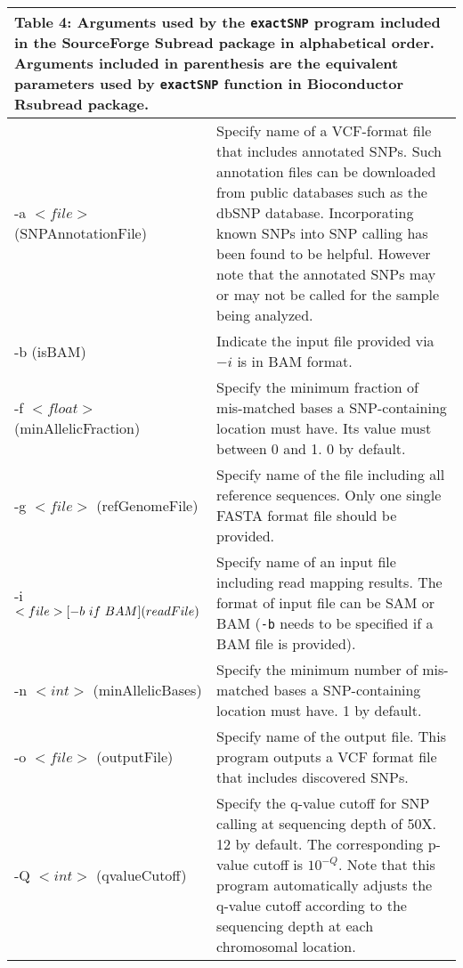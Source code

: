 \documentclass[12pt]{report}
\newcommand{\code}[1]{{\small\texttt{#1}}}
\newcommand{\Subread}{\textsf{Subread}}
\newcommand{\Rsubread}{\textsf{Rsubread}}
\begin{document}
\begin{longtable}{|p{4.5cm}|p{11cm}|}
\multicolumn{2}{p{16cm}}{Table 4: Arguments used by the \code{exactSNP} program included in the SourceForge {\Subread} package in alphabetical order.
Arguments included in parenthesis are the equivalent parameters used by \code{exactSNP} function in Bioconductor {\Rsubread} package.}
\endfirsthead
\hline
Arguments & Description \\
\hline
-a $<file>$ \newline (SNPAnnotationFile) & Specify name of a VCF-format file that includes annotated SNPs. Such annotation files can be downloaded from public databases such as the dbSNP database. Incorporating known SNPs into SNP calling has been found to be helpful. However note that the annotated SNPs may or may not be called for the sample being analyzed. \\
\hline
-b \newline (isBAM) & Indicate the input file provided via $-i$ is in BAM format. \\
\hline
-f $<float>$ \newline (minAllelicFraction) & Specify the minimum fraction of mis-matched bases a SNP-containing location must have. Its value must between 0 and 1. 0 by default. \\
\hline
-g $<file>$ \newline (refGenomeFile) & Specify name of the file including all reference sequences. Only one single FASTA format file should be provided. \\
\hline
-i $<file> [-b\ if\ BAM] \newline (readFile)$ & Specify name of an input file including read mapping results. The format of input file can be SAM or BAM  (\code{-b} needs to be specified if a BAM file is provided).\\
\hline
-n $<int>$ \newline (minAllelicBases) & Specify the minimum number of mis-matched bases a SNP-containing location must have. 1 by default.\\
\hline
-o $<file>$ \newline (outputFile) & Specify name of the output file. This program outputs a VCF format file that includes discovered SNPs. \\
\hline
-Q $<int>$  \newline (qvalueCutoff) &  Specify the q-value cutoff for SNP calling at sequencing depth of 50X. 12 by default. The corresponding p-value cutoff is $10^{-Q}$. Note that this program automatically adjusts the q-value cutoff according to the sequencing depth at each chromosomal location.\\

\end{longtable}
\end{document}
